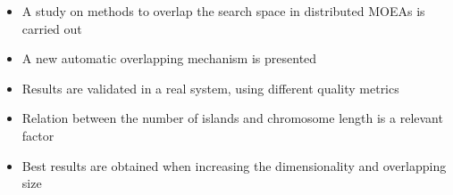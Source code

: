 \documentclass{article}
\begin{document}




\begin{itemize}
\item A study on methods to overlap the search space in distributed MOEAs is carried out  
\item A new automatic overlapping mechanism is presented
\item Results are validated in a real system, using different quality metrics
\item Relation between the number of islands and chromosome length is a relevant factor
\item Best results are obtained when increasing the dimensionality and overlapping size
\end{itemize}
\end{document}
